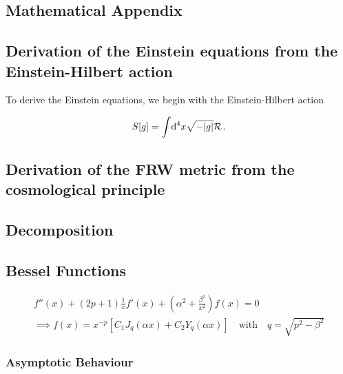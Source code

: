 \documentclass[parskip=half]{scrreprt}
\begin{document}
\begin{appendices}

\chapter{Mathematical Appendix}

\section{Derivation of the Einstein equations from the Einstein-Hilbert action}\label{app:deriv_einstein_eqns}

To derive the Einstein equations, we begin with the Einstein-Hilbert action

\begin{align}
	S[g] = \int \! \dif{^4x} \sqrt{-|g|} \Rscal \, \textrm{.}
\end{align}


\section{Derivation of the FRW metric from the cosmological principle}\label{app:deriv_frw}


\section{Decomposition}\label{app:deriv_decompose}

\section{Bessel Functions}

\begin{align}
	f''(x) + \left(2p+1\right)\frac{1}{x} f'(x) + \left(\alpha^2 + \frac{\beta^2}{x^2}\right) f(x) = 0 \\
	\implies f(x) = x^{-p} \left[C_1 J_q(\alpha x) + C_2 Y_q(\alpha x)\right] \quad \textrm{with} \quad q = \sqrt{p^2 - \beta^2}
\end{align}

\subsection{Asymptotic Behaviour}

\end{appendices}



\end{document}
